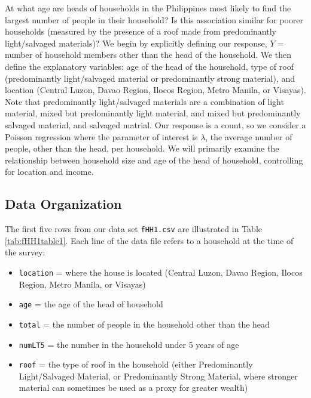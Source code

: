 \documentclass[
]{krantz}
\providecommand{\tightlist}{%
  \setlength{\itemsep}{0pt}\setlength{\parskip}{0pt}}
\begin{document}
At what age are heads of households in the Philippines most likely to find the largest number of people in their household? Is this association similar for poorer households (measured by the presence of a roof made from predominantly light/salvaged materials)? We begin by explicitly defining our response, \(Y=\) number of household members other than the head of the household. We then define the explanatory variables: age of the head of the household, type of roof (predominantly light/salvaged material or predominantly strong material), and location (Central Luzon, Davao Region, Ilocos Region, Metro Manila, or Visayas). Note that predominantly light/salvaged materials are a combination of light material, mixed but predominantly light material, and mixed but predominantly salvaged material, and salvaged matrial. Our response is a count, so we consider a Poisson regression where the parameter of interest is \(\lambda\), the average number of people, other than the head, per household. We will primarily examine the relationship between household size and age of the head of household, controlling for location and income.

\hypertarget{organizedata4}{%
\subsection{Data Organization}\label{organizedata4}}

The first five rows from our data set \texttt{fHH1.csv} are illustrated in Table \ref{tab:fHH1table1}. Each line of the data file refers to a household at the time of the survey:

\begin{itemize}
\tightlist
\item
  \texttt{location} = where the house is located (Central Luzon, Davao Region, Ilocos Region, Metro Manila, or Visayas)
\item
  \texttt{age} = the age of the head of household
\item
  \texttt{total} = the number of people in the household other than the head
\item
  \texttt{numLT5} = the number in the household under 5 years of age
\item
  \texttt{roof} = the type of roof in the household (either Predominantly Light/Salvaged Material, or Predominantly Strong Material, where stronger material can sometimes be used as a proxy for greater wealth)
\end{itemize}
\end{document}
